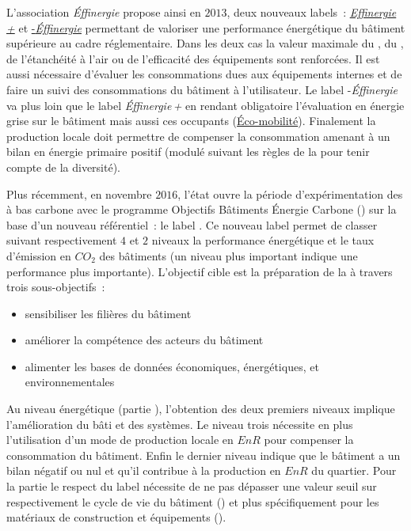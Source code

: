 L’association \textit{Éffinergie} propose ainsi en $2013$, deux nouveaux labels~:
\href{https://www.effinergie.org/web/index.php/les-labels-effinergie/le-label-effinergie-plus}{\textit{Effinergie +}}
et \href{https://www.effinergie.org/web/index.php/les-labels-effinergie/bepos-effinergie}{-\textit{Éffinergie}}
permettant de valoriser une performance énergétique du bâtiment
supérieure au cadre réglementaire. Dans les deux cas la valeur maximale du ,
du , de l’étanchéité à l’air ou de l’efficacité des équipements sont renforcées.
Il est aussi nécessaire d’évaluer les consommations dues aux équipements internes
et de faire un suivi des consommations du bâtiment à l’utilisateur.
Le label -\textit{Éffinergie} va plus loin que le label \textit{Éffinergie\,+} en rendant
obligatoire l’évaluation en énergie grise sur le bâtiment mais aussi ces occupants
(\href{https://www.effinergie.org/web/index.php/effinergie-ecomobilite}{Éco-mobilité}).
Finalement la production locale doit permettre de compenser la consommation amenant à
un bilan en énergie primaire positif (modulé suivant les règles de la 
pour tenir compte de la diversité).


Plus récemment, en novembre $2016$, l’état ouvre la période d’expérimentation des  à
bas carbone avec le programme Objectifs Bâtiments Énergie Carbone () sur la base d’un
nouveau référentiel~: le label  \parencite{Ministere2016}. Ce nouveau label permet de classer suivant
respectivement $4$ et $2$ niveaux la performance énergétique et le taux d’émission en $CO_{2}$
des bâtiments (un niveau plus important indique une performance plus importante). L’objectif
cible est la préparation de la  à travers trois sous-objectifs~:
\begin{itemize}
    \item sensibiliser les filières du bâtiment
    \item améliorer la compétence des acteurs du bâtiment
    \item alimenter les bases de données économiques, énergétiques, et environnementales
\end{itemize}
Au niveau énergétique (partie ), l’obtention des deux premiers niveaux implique l’amélioration
du bâti et des systèmes. Le niveau trois nécessite en plus l’utilisation d’un mode
de production locale en $EnR$ pour compenser la consommation du bâtiment. Enfin le dernier
niveau indique que le bâtiment a un bilan négatif ou nul et qu’il contribue à la
production en $EnR$ du quartier. Pour la partie  le respect du label nécessite
de ne pas dépasser une valeur seuil sur respectivement le cycle de vie du bâtiment
() et plus spécifiquement pour les matériaux de construction et équipements ().

